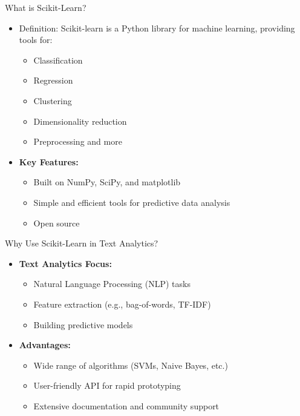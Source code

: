 	\begin{frame}{What is Scikit-Learn?}
		\begin{itemize}
			\item {\color{yellow}Definition:} Scikit-learn is a Python library for machine learning, providing tools for:
			\begin{itemize}
				\item Classification
				\item Regression
				\item Clustering
				\item Dimensionality reduction
				\item Preprocessing and more
			\end{itemize}
			\item \textbf{Key Features:}
			\begin{itemize}
				\item Built on NumPy, SciPy, and matplotlib
				\item Simple and efficient tools for predictive data analysis
				\item Open source
			\end{itemize}
		\end{itemize}
	\end{frame}
	
	\begin{frame}{Why Use Scikit-Learn in Text Analytics?}
		\begin{itemize}
			\item \textbf{Text Analytics Focus:}
			\begin{itemize}
				\item Natural Language Processing (NLP) tasks
				\item Feature extraction (e.g., bag-of-words, TF-IDF)
				\item Building predictive models
			\end{itemize}
			\item \textbf{Advantages:}
			\begin{itemize}
				\item Wide range of algorithms (SVMs, Naive Bayes, etc.)
				\item User-friendly API for rapid prototyping
				\item Extensive documentation and community support
			\end{itemize}
		\end{itemize}
	\end{frame}
	

